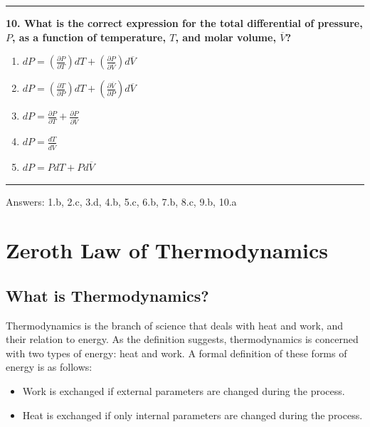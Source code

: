 \documentclass[
  9pt,
]{extbook}
\providecommand{\tightlist}{%
  \setlength{\itemsep}{0pt}\setlength{\parskip}{0pt}}
\theoremstyle{definition}
\theoremstyle{definition}
\theoremstyle{definition}
\theoremstyle{remark}
\begin{document}
\begin{center}\rule{0.5\linewidth}{0.5pt}\end{center}

\textbf{10. What is the correct expression for the total differential of pressure, \(P\), as a function of temperature, \(T\), and molar volume, \(\overline{V}\)?}

\begin{enumerate}
\def\labelenumi{\alph{enumi}.}
\tightlist
\item
  \(dP = \left(\frac{\partial P}{\partial T}\right)dT + \left(\frac{\partial P}{\partial \overline{V}}\right)d\overline{V}\)
\item
  \(dP = \left(\frac{\partial T}{\partial P}\right)dT + \left(\frac{\partial \overline{V}}{\partial P}\right)d\overline{V}\)
\item
  \(dP = \frac{\partial P}{\partial T} + \frac{\partial P}{\partial \overline{V}}\)
\item
  \(dP = \frac{dT}{d\overline{V}}\)
\item
  \(dP = PdT + Pd\overline{V}\)
\end{enumerate}

\begin{center}\rule{0.5\linewidth}{0.5pt}\end{center}

Answers: 1.b, 2.c, 3.d, 4.b, 5.c, 6.b, 7.b, 8.c, 9.b, 10.a

\hypertarget{ZerothLaw}{%
\chapter{Zeroth Law of Thermodynamics}\label{ZerothLaw}}

\hypertarget{what-is-thermodynamics}{%
\section{What is Thermodynamics?}\label{what-is-thermodynamics}}

Thermodynamics is the branch of science that deals with heat and work, and their relation to energy. As the definition suggests, thermodynamics is concerned with two types of energy: heat and work. A formal definition of these forms of energy is as follows:

\begin{itemize}
\tightlist
\item
  Work is exchanged if external parameters are changed during the process.
\item
  Heat is exchanged if only internal parameters are changed during the process.
\end{itemize}
\end{document}

